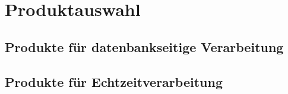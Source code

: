 \chapter{Produktauswahl}
\section{Produkte für datenbankseitige Verarbeitung}


\section{Produkte für Echtzeitverarbeitung}
